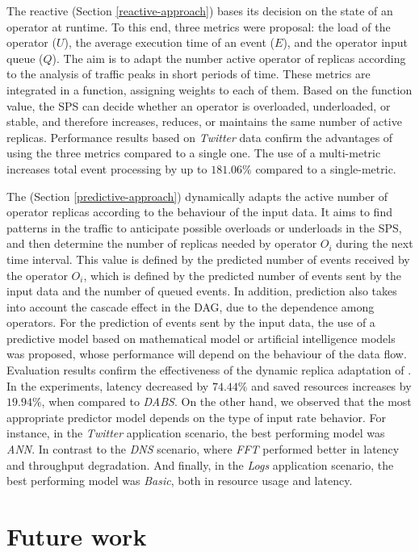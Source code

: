 The reactive \rSPS{} (Section \ref{reactive-approach}) bases its decision on the state of an operator at runtime. To this end, three metrics were proposal: the load of the operator ($U$), the average execution time of an event ($E$), and the operator input queue ($Q$). The aim is to adapt the number active operator of replicas according to the analysis of traffic peaks in short periods of time. These metrics are integrated in a function, assigning weights to each of them. Based on the function value, the SPS can decide whether an operator is overloaded, underloaded, or stable, and therefore increases, reduces, or maintains the same number of active replicas. Performance results based on \textit{Twitter} data confirm the advantages of using the three metrics compared to a single one. The use of a multi-metric increases total event processing by up to $181.06\%$ compared to a single-metric.

The \pSPS{} (Section \ref{predictive-approach}) dynamically adapts the active number of operator replicas according to the behaviour of the input data. It aims to find patterns in the traffic to anticipate possible overloads or underloads in the SPS, and then determine the number of replicas needed by operator $O_i$ during the next time interval. This value is defined by the predicted number of events received by the operator $O_i$, which is defined by the predicted number of events sent by the input data and the number of queued events. In addition, prediction also takes into account the cascade effect in the DAG, due to the dependence among operators. For the prediction of events sent by the input data, the use of a predictive model based on mathematical model or artificial intelligence models was proposed, whose performance will depend on the behaviour of the data flow. Evaluation results confirm the effectiveness of the dynamic replica adaptation of \pSPS{}. In the experiments, latency decreased by $74.44\%$ and saved resources increases by $19.94\%$, when compared to \textit{DABS}. On the other hand, we observed that the most appropriate predictor model depends on the type of input rate behavior. For instance, in the \textit{Twitter} application scenario, the best performing model was \textit{ANN}. In contrast to the \textit{DNS} scenario, where \textit{FFT} performed better in latency and throughput degradation. And finally, in the \textit{Logs} application scenario, the best performing model was \textit{Basic}, both in resource usage and latency.

\section{Future work}

